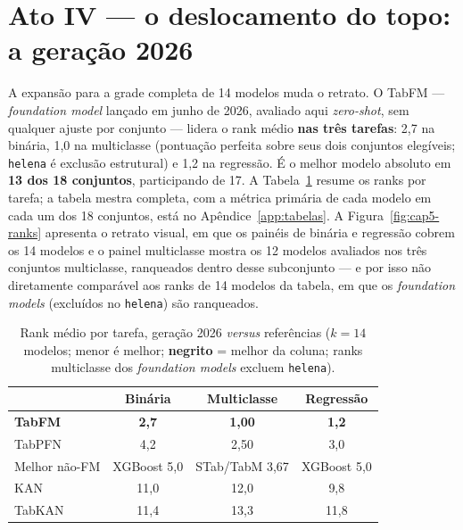 \section{Ato IV --- o deslocamento do topo: a geração 2026}
\label{sec:cap5-ato4}

A expansão para a grade completa de 14 modelos muda o retrato. O TabFM
--- \emph{foundation model} lançado em junho de 2026, avaliado aqui
\emph{zero-shot}, sem qualquer ajuste por conjunto --- lidera o rank
médio \textbf{nas três tarefas}: 2,7 na binária, 1,0 na multiclasse
(pontuação perfeita sobre seus dois conjuntos elegíveis;
\texttt{helena} é exclusão estrutural) e 1,2 na regressão. É o melhor
modelo absoluto em \textbf{13 dos 18 conjuntos}, participando de 17. A
Tabela~\ref{tab:cap5-ranks} resume os ranks por tarefa; a tabela mestra
completa, com a métrica primária de cada modelo em cada um dos 18
conjuntos, está no Apêndice~\ref{app:tabelas}. A
Figura~\ref{fig:cap5-ranks} apresenta o retrato visual, em que os painéis
de binária e regressão cobrem os 14 modelos e o painel multiclasse mostra
os 12 modelos avaliados nos três conjuntos multiclasse, ranqueados dentro
desse subconjunto --- e por isso não diretamente comparável aos ranks de
14 modelos da tabela, em que os \emph{foundation models} (excluídos no
\texttt{helena}) são ranqueados.

\begin{table}[htbp]
\centering
\caption[Rank médio por tarefa: extensão 2026]{Rank médio por tarefa, geração 2026 \emph{versus} referências
($k{=}14$ modelos; menor é melhor; \textbf{negrito} = melhor da coluna;
ranks multiclasse dos \emph{foundation models} excluem \texttt{helena}).}
\label{tab:cap5-ranks}
\begin{tabular}{lccc}
\toprule
 & Binária & Multiclasse & Regressão \\
\midrule
\textbf{TabFM}      & \textbf{2,7} & \textbf{1,00} & \textbf{1,2} \\
TabPFN              & 4,2          & 2,50          & 3,0 \\
Melhor não-FM       & XGBoost 5,0  & STab/TabM 3,67 & XGBoost 5,0 \\
KAN                 & 11,0         & 12,0          & 9,8 \\
TabKAN              & 11,4         & 13,3          & 11,8 \\
\bottomrule
\end{tabular}
\end{table}


